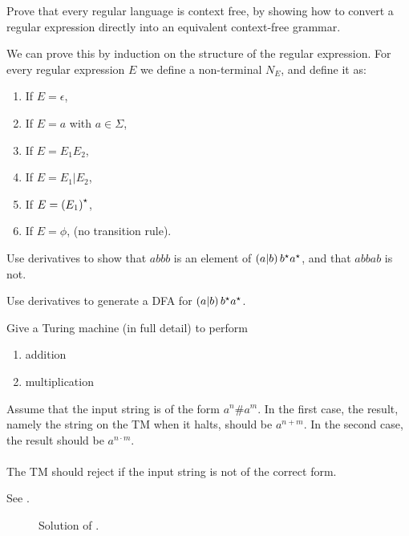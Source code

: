 \documentclass{article}
\begin{document}
\begin{exercise}
Prove that every regular language is context free, by showing how to convert a regular expression directly into an equivalent context-free grammar.
\begin{answer}
We can prove this by induction on the structure of the regular expression. For every regular expression $E$ we define a non-terminal $N_E$, and define it as:
\begin{enumerate}
 \item If $E=\epsilon$, 
 \item If $E=a$ with $a\in\Sigma$, 
 \item If $E=E_1E_2$, 
 \item If $E=E_1|E_2$, 
 \item If $E=\left( E_1 \right)^{\star}$, 
 \item If $E=\phi$,  (no transition rule).
\end{enumerate}
\end{answer}
\end{exercise}

\begin{exercise}
Use derivatives to show that $abbb$ is an element of $\left( a|b \right)b^{\star}a^{\star}$, and that $abbab$ is not.
\begin{answer}

\end{answer}
\end{exercise}

\begin{exercise}
Use derivatives to generate a DFA for $\left( a|b \right)b^{\star}a^{\star}$.
\begin{answer}

\end{answer}
\end{exercise}

\begin{exercise}
Give a Turing machine (in full detail) to perform
\begin{enumerate}
 \item addition
 \item multiplication
\end{enumerate}
Assume that the input string is of the form $a^n\#a^m$. In the first case, the result, namely the string on the TM when it halts, should be $a^{n+m}$. In the second case, the result should be $a^{n\cdot m}$.
\paragraph{}
The TM should reject if the input string is not of the correct form.
\begin{answer}
See .
\begin{figure}[hbt]
\centering
{}
\caption{Solution of .}
\end{figure}
\end{answer}
\end{exercise}
\end{document}
